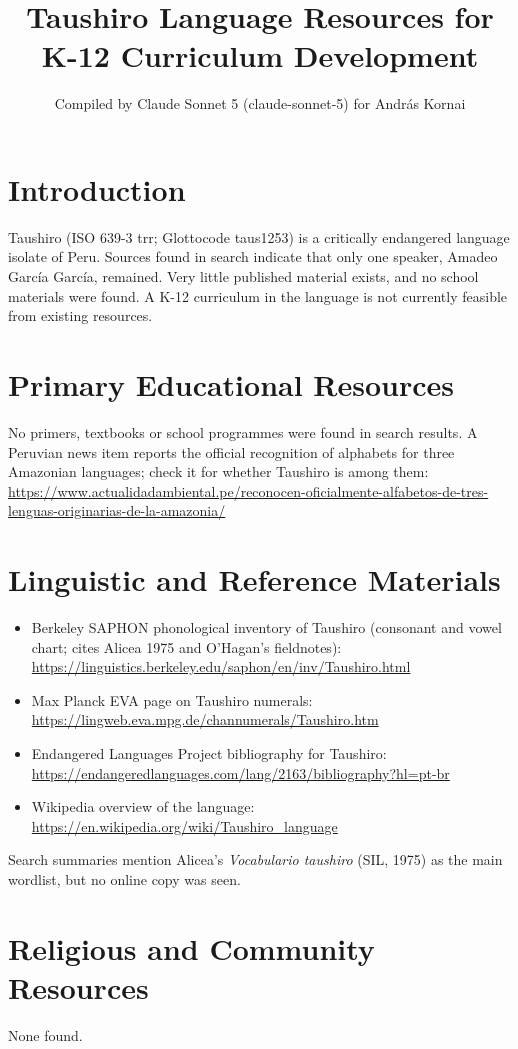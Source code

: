 \documentclass[12pt]{article}
\title{Taushiro Language Resources for K-12 Curriculum Development}
\author{Compiled by Claude Sonnet 5 (claude-sonnet-5) for Andr\'as Kornai}
\date{}
\begin{document}
\maketitle

\section{Introduction}
Taushiro (ISO 639-3 trr; Glottocode taus1253) is a critically endangered language isolate of Peru. Sources found in search indicate that only one speaker, Amadeo Garc\'ia Garc\'ia, remained. Very little published material exists, and no school materials were found. A K-12 curriculum in the language is not currently feasible from existing resources.

\section{Primary Educational Resources}
No primers, textbooks or school programmes were found in search results. A Peruvian news item reports the official recognition of alphabets for three Amazonian languages; check it for whether Taushiro is among them:
\url{https://www.actualidadambiental.pe/reconocen-oficialmente-alfabetos-de-tres-lenguas-originarias-de-la-amazonia/}

\section{Linguistic and Reference Materials}
\begin{itemize}
\item Berkeley SAPHON phonological inventory of Taushiro (consonant and vowel chart; cites Alicea 1975 and O'Hagan's fieldnotes): \url{https://linguistics.berkeley.edu/saphon/en/inv/Taushiro.html}
\item Max Planck EVA page on Taushiro numerals: \url{https://lingweb.eva.mpg.de/channumerals/Taushiro.htm}
\item Endangered Languages Project bibliography for Taushiro: \url{https://endangeredlanguages.com/lang/2163/bibliography?hl=pt-br}
\item Wikipedia overview of the language: \url{https://en.wikipedia.org/wiki/Taushiro_language}
\end{itemize}
Search summaries mention Alicea's \emph{Vocabulario taushiro} (SIL, 1975) as the main wordlist, but no online copy was seen.

\section{Religious and Community Resources}
None found.
\end{document}
